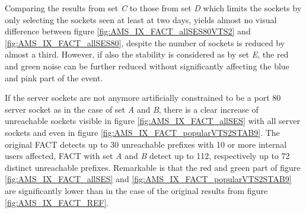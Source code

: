 Comparing the results from set \emph{C} to those from set \emph{D} which limits the sockets by only selecting the sockets seen at least at two days, yields almost no visual difference between figure \ref{fig:AMS_IX_FACT_allSES80VTS2} and \ref{fig:AMS_IX_FACT_allSES80}, despite the number of sockets is reduced by almost a third. 
However, if also the stability is considered as by set \emph{E}, the red and green noise can be further reduced without significantly affecting the blue and pink part of the event.

If the \glspl{server socket} are not anymore artificially constrained to be a port 80 \gls{server socket} as in the case of set \emph{A} and \emph{B}, there is a clear increase of unreachable sockets visible in figure \ref{fig:AMS_IX_FACT_allSES} with all server sockets and even in figure \ref{fig:AMS_IX_FACT_popularVTS2STAB9}. 
The original \gls{FACT} detects up to 30 unreachable prefixes with 10 or more internal users affected, \gls{FACT} with set \emph{A} and \emph{B} detect up to 112, respectively up to 72 distinct unreachable prefixes.
Remarkable is that the red and green part of figure \ref{fig:AMS_IX_FACT_allSES} and \ref{fig:AMS_IX_FACT_popularVTS2STAB9} are significantly lower than in the case of the original results from figure \ref{fig:AMS_IX_FACT_REF}. 

